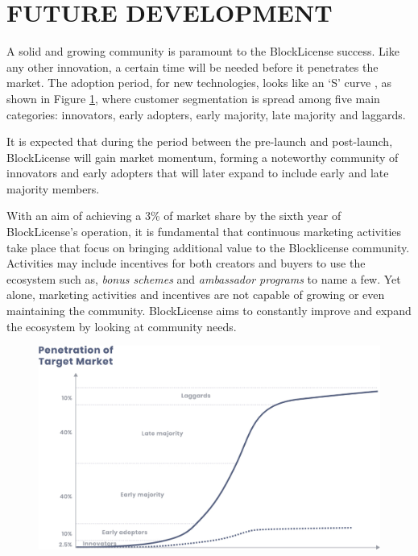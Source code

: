 \newpage

 
\section{FUTURE DEVELOPMENT}

A solid and growing community is paramount to the BlockLicense success. Like any other innovation, a certain time will be needed before it penetrates the market.  The adoption period, for new technologies, looks like an ‘S’ curve \cite{pierre}, as shown in Figure \ref{fig:scurve}, where customer segmentation is spread among five main categories: innovators, early adopters, early majority, late majority and laggards.

It is expected that during the period between the pre-launch and post-launch, BlockLicense will gain market momentum, forming a noteworthy community of innovators and early adopters that will later expand to include early and late majority members. 

With an aim of achieving a 3\% of market share by the sixth year of  BlockLicense's operation, it is fundamental that  continuous marketing activities take place that focus on bringing additional value to the Blocklicense community. Activities may include incentives for both creators and buyers to use the ecosystem such as, \textit{bonus schemes} and \textit{ambassador programs} to name a few. Yet alone, marketing activities and incentives are not capable of growing or even maintaining the community. BlockLicense aims to constantly improve and expand the ecosystem by looking at community needs.

\begin{figure}[!htbp]
\centering
\begin{minipage}{1\textwidth}
  \centering
  \includegraphics[width=.8\linewidth]{./figures/fig11.jpg}
  \label{fig:scurve}
\end{minipage}
\end{figure}